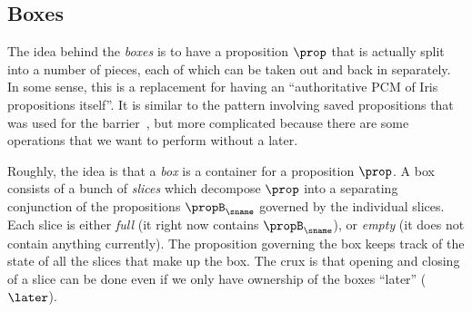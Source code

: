 \subsection{Boxes}

The idea behind the \emph{boxes} is to have a proposition $\prop$ that is actually split into a number of pieces, each of which can be taken out and back in separately.
In some sense, this is a replacement for having an ``authoritative PCM of Iris propositions itself''.
It is similar to the pattern involving saved propositions that was used for the barrier~\cite{iris2}, but more complicated because there are some operations that we want to perform without a later.

Roughly, the idea is that a \emph{box} is a container for a proposition $\prop$.
A box consists of a bunch of \emph{slices} which decompose $\prop$ into a separating conjunction of the propositions $\propB_\sname$ governed by the individual slices.
Each slice is either \emph{full} (it right now contains $\propB_\sname$), or \emph{empty} (it does not contain anything currently).
The proposition governing the box keeps track of the state of all the slices that make up the box.
The crux is that opening and closing of a slice can be done even if we only have ownership of the boxes ``later'' ($\later$).

